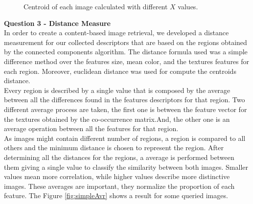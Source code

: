 \documentclass[12pt,a4paper]{article}
\begin{document}
\begin{figure}[!h]
{{		}
		\label{fig:cent10}
	}
	\quad
	\caption{Centroid of each image calculated with different $X$ values.}
	\label{fig:cent}
\end{figure}


\newpage

\textbf{\LARGE Question 3 - Distance Measure} \\

In order to create a content-based image retrieval, we developed a distance measurement for our collected descriptors that are based on the regions obtained by the connected components algorithm. The distance formula used was a simple difference method over the features size, mean color, and the textures features for each region. Moreover, euclidean distance was used for compute the centroids distance. \\

Every region is described by a single value that is composed by the average between all the differences found in the features descriptors for that region. Two different average process are taken, the first one is between the feature vector for the textures obtained by the co-occurrence matrix.And, the other one is an average operation between all the features for that region. \\

As images might contain different number of regions, a region is compared to all others and the minimum distance is chosen to represent the region. After determining all the distances for the regions, a average is performed between them giving a single value to classify the similarity between both images. Smaller values mean more correlation, while higher values describe more distinctive images. These averages are important, they normalize the proportion of each feature. The Figure \ref{fig:simpleAvr} shows a result for some queried images. \\
\end{document}
